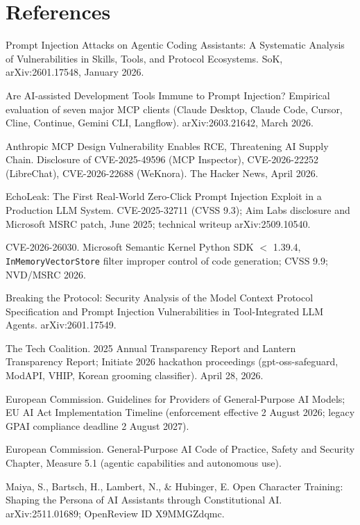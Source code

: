 \documentclass[11pt]{article}
\begin{document}
\section*{References}
\small
\begin{enumerate}[label={[\arabic*]}, leftmargin=2.4em, itemsep=2pt]
\item[{[1]}] Prompt Injection Attacks on Agentic Coding Assistants: A Systematic Analysis of Vulnerabilities in Skills, Tools, and Protocol Ecosystems. SoK, arXiv:2601.17548, January 2026.
\item[{[2]}] Are AI-assisted Development Tools Immune to Prompt Injection? Empirical evaluation of seven major MCP clients (Claude Desktop, Claude Code, Cursor, Cline, Continue, Gemini CLI, Langflow). arXiv:2603.21642, March 2026.
\item[{[3]}] Anthropic MCP Design Vulnerability Enables RCE, Threatening AI Supply Chain. Disclosure of CVE-2025-49596 (MCP Inspector), CVE-2026-22252 (LibreChat), CVE-2026-22688 (WeKnora). The Hacker News, April 2026.
\item[{[3a]}] EchoLeak: The First Real-World Zero-Click Prompt Injection Exploit in a Production LLM System. CVE-2025-32711 (CVSS 9.3); Aim Labs disclosure and Microsoft MSRC patch, June 2025; technical writeup arXiv:2509.10540.
\item[{[3b]}] CVE-2026-26030. Microsoft Semantic Kernel Python SDK $<$ 1.39.4, \texttt{InMemoryVectorStore} filter improper control of code generation; CVSS 9.9; NVD/MSRC 2026.
\item[{[4]}] Breaking the Protocol: Security Analysis of the Model Context Protocol Specification and Prompt Injection Vulnerabilities in Tool-Integrated LLM Agents. arXiv:2601.17549.
\item[{[5]}] The Tech Coalition. 2025 Annual Transparency Report and Lantern Transparency Report; Initiate 2026 hackathon proceedings (gpt-oss-safeguard, ModAPI, VHIP, Korean grooming classifier). April 28, 2026.
\item[{[6]}] European Commission. Guidelines for Providers of General-Purpose AI Models; EU AI Act Implementation Timeline (enforcement effective 2 August 2026; legacy GPAI compliance deadline 2 August 2027).
\item[{[7]}] European Commission. General-Purpose AI Code of Practice, Safety and Security Chapter, Measure 5.1 (agentic capabilities and autonomous use).
\item[{[8]}] Maiya, S., Bartsch, H., Lambert, N., \& Hubinger, E. Open Character Training: Shaping the Persona of AI Assistants through Constitutional AI. arXiv:2511.01689; OpenReview ID X9MMGZdqmc.

\end{enumerate}
\end{document}
